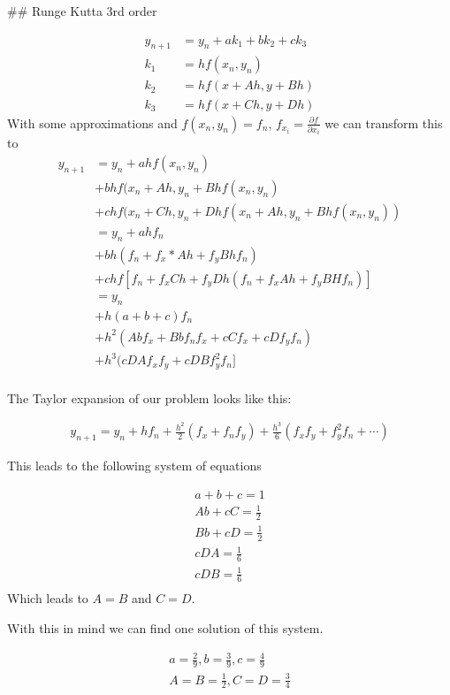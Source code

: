 ## Runge Kutta 3rd order

\begin{align}
y_{n+1} &= y_n + a k_1 + b k_2 + c k_3\\
k_1 &= hf(x_n,y_n)\\
k_2 &= hf(x+Ah, y+Bh)\\
k_3 &= hf(x+Ch, y+Dh)
\end{align}
With some approximations and $f(x_n, y_n) = f_n$, $f_{x_i} = \frac{\partial f}{\partial x_i}$ we can transform this to
\begin{align}
y_{n+1}&= y_n + ahf(x_n,y_n)\\
&+ bhf(x_n + Ah, y_n + Bhf(x_n, y_n)\\
&+ chf(x_n + Ch, y_n + Dhf(x_n + Ah, y_n+Bhf(x_n, y_n))\\
&= y_n + ahf_n\\
&+ bh (f_n+ f_x*Ah + f_yBh f_n)\\
&+ chf[f_n + f_x Ch + f_yDh (f_n+f_xAh + f_y BHf_n)]\\
&= y_n\\
&+ h(a+b+c)f_n\\
&+ h^2 (Abf_x + Bbf_nf_x + cCf_x + cDf_yf_n)\\
&+ h^3 (cDAf_xf_y + cDB f_y^2f_n]\\
\end{align}

The Taylor expansion of our problem looks like this:

\begin{align}
y_{n+1} = y_n + hf_n + \frac{h^2}{2}(f_x + f_n f_y) + \frac{h^3}{6} (f_x f_y + f_y^2 f_n + \cdots)
\end{align}

This leads to the following system of equations

\begin{align}
a + b + c = 1\\
Ab+cC = \frac{1}{2}\\
Bb+cD = \frac{1}{2}\\
cDA = \frac{1}{6}\\
cDB = \frac{1}{6}\\
\end{align}
Which leads to $A=B$ and $C=D$.

With this in mind we can find one solution of this system.

\begin{align}
a = \frac{2}{9}, b = \frac{3}{9}, c=\frac{4}{9}\\
A = B = \frac{1}{2}, C = D = \frac{3}{4}
\end{align}

